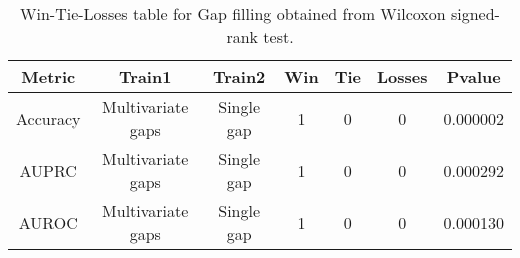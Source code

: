 \begin{table}[H]
\centering
\begin{tabular}{|c|c|c|c|c|c|c|}

\textbf{Metric} &    \textbf{Train1} & \textbf{Train2} &  \textbf{Win} &  \textbf{Tie} &  \textbf{Losses} &  \textbf{Pvalue} \\
\hline

       Accuracy &  Multivariate gaps &      Single gap &             1 &             0 &                0 &         0.000002 \\
\hline
          AUPRC &  Multivariate gaps &      Single gap &             1 &             0 &                0 &         0.000292 \\
\hline
          AUROC &  Multivariate gaps &      Single gap &             1 &             0 &                0 &         0.000130 \\
\hline

\end{tabular}
\caption{Win-Tie-Losses table for Gap filling obtained from Wilcoxon signed-rank test.}
\label{tab:gap_filling_training_data_comparison}
\end{table}
